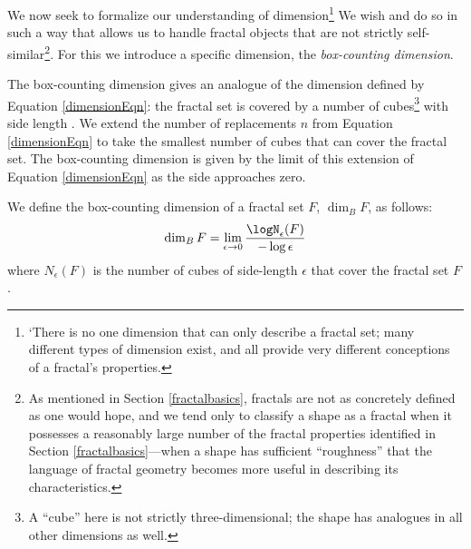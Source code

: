 We now seek to formalize our understanding of dimension\footnote{`There is no one dimension that can only describe a fractal set; many different types of dimension exist, and all provide very different conceptions of a fractal's properties\citep{fractaltextbook}.} We wish  and do so in such a way that allows us to handle fractal objects that are not strictly self-similar\footnote{As mentioned in Section \ref{fractalbasics}, fractals are not as concretely defined as one would hope, and we tend only to classify a shape as a fractal when it possesses a reasonably large number of the fractal properties identified in Section \ref{fractalbasics}---when a shape has sufficient ``roughness'' that the language of fractal geometry becomes more useful in describing its characteristics.}. For this we introduce a specific dimension, the \textit{box-counting dimension}.

The box-counting dimension gives an analogue of the dimension defined by Equation \ref{dimensionEqn}: the fractal set is covered by a number of cubes\footnote{A ``cube'' here is not strictly three-dimensional; the shape has analogues in all other dimensions as well.} with side length \epsilon. We extend the number of replacements $n$ from Equation \ref{dimensionEqn} to take the smallest number of cubes that can cover the fractal set. The box-counting dimension is given by the limit of this extension of Equation \ref{dimensionEqn} as the side \epsilon approaches zero.

\begin{mydef} We define the box-counting dimension of a fractal set $ F $, $\operatorname{dim}_B F $, as follows:
\begin{equation}\operatorname{dim}_B F = \lim_{\epsilon \to 0} \frac{\logN_\epsilon(F)}{-\log\epsilon}
\end{equation}
where $N_\epsilon(F)$ is the number of cubes of side-length $\epsilon$ that cover the fractal set $F$.
\end{mydef}






































